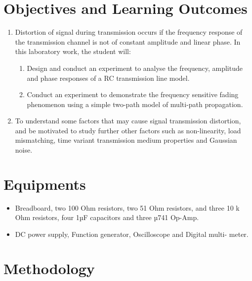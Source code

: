 \documentclass[a4paper, 12pt, english]{article}
\begin{document}
\section{Objectives and Learning Outcomes}
\begin{enumerate}
	\item Distortion of signal during transmission occurs if the frequency response of
	      the transmission channel is not of constant amplitude and linear phase. In this
	      laboratory work, the student will:

	      \begin{enumerate}
		      \item Design and conduct an experiment to analyse the frequency, amplitude and phase
		            responses of a RC transmission line model.
		      \item Conduct an experiment to demonstrate the frequency sensitive fading phenomenon
		            using a simple two-path model of multi-path propagation.
	      \end{enumerate}
	\item To understand some factors that may cause signal transmission distortion, and
	      be motivated to study further other factors such as non-linearity, load
	      mismatching, time variant transmission medium properties and Gaussian noise.
\end{enumerate}


\section{Equipments}

\begin{itemize}
	\item  Breadboard, two 100 Ohm resistors, two 51 Ohm resistors, and three 10 k Ohm
	      resistors, four 1µF capacitors and three µ741 Op-Amp.
	\item  DC power supply, Function generator, Oscilloscope and Digital multi- meter.
\end{itemize}


\section{Methodology}
\end{document}
